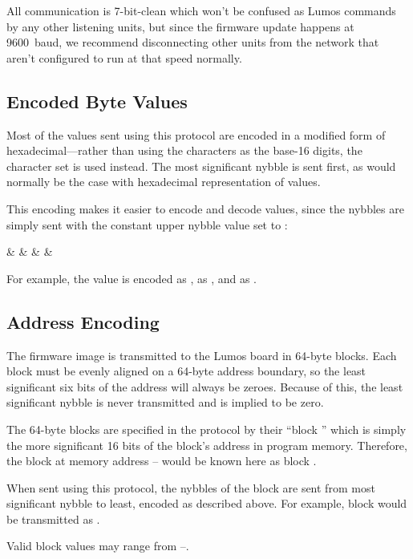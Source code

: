 \documentclass[letterpaper,twoside,onecolumn,openright,final]{memoir}
\begin{document}
All communication is 7-bit-clean  which won't be confused
as Lumos commands by any other listening units, but since the firmware
update happens at 9600~baud, we recommend disconnecting other units from
the network that aren't configured to run at that speed normally.

\subsection{Encoded Byte Values}\label{ss:flashbytes}
Most of the values sent using this protocol are encoded in a modified
form of hexadecimal---rather than using the characters 
as the base-16 digits, the character set  is used instead.
The most significant nybble is sent first, as would normally be the case
with hexadecimal representation of values.

This encoding makes it easier to encode and decode values, since the nybbles
are simply sent with the constant upper nybble value set to :
\begin{BF}
	&  
	&  
	&  
	& 
\end{BF}

For example, the value  is encoded as ,  as ,
and  as .

\subsection{Address Encoding}\label{ss:blockid}
The firmware image is transmitted to the Lumos board in 64-byte blocks.  Each
block must be evenly aligned on a 64-byte address boundary, so
the least significant six bits of the address will always be zeroes.  Because
of this, the least significant nybble is never transmitted and is implied to
be zero.  

The 64-byte blocks are specified in the protocol by their ``block '' which is simply the more significant 16 bits of the block's address in
program memory.  Therefore, the block at memory address --
would be known here as block  .

When sent using this protocol, the nybbles of the block  are 
sent from most significant nybble to least, encoded as described above.
For example, block  would be transmitted as .

Valid block  values may range from --.
\end{document}
